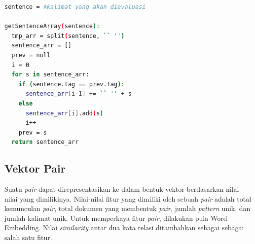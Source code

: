 \begin{lstlisting}[caption={Proses \textit{parsing} kalimat menjadi \textit{array}}, language=bash, label={code:pembentukan-stree}]
sentence = #kalimat yang akan dievaluasi

getSentenceArray(sentence):
  tmp_arr = split(sentence, `` '')
  sentence_arr = []
  prev = null
  i = 0
  for s in sentence_arr:
    if (sentence.tag == prev.tag):
      sentence_arr[i-1] += `` '' + s
    else
      sentence_arr[i].add(s)
      i++
    prev = s
  return sentence_arr
\end{lstlisting}
%

  


\subsection{Vektor Pair}
Suatu \textit{pair} dapat direpresentasikan ke dalam bentuk vektor berdasarkan nilai-nilai yang dimilikinya. Nilai-nilai fitur yang dimiliki oleh sebuah \textit{pair} adalah total kemunculan \textit{pair}, total dokumen yang membentuk \textit{pair}, jumlah \textit{pattern} unik, dan jumlah kalimat unik. Untuk memperkaya fitur \textit{pair}, dilakukan pula Word Embedding. Nilai \textit{similarity} antar dua kata relasi ditambahkan sebagai sebagai salah satu fitur.

